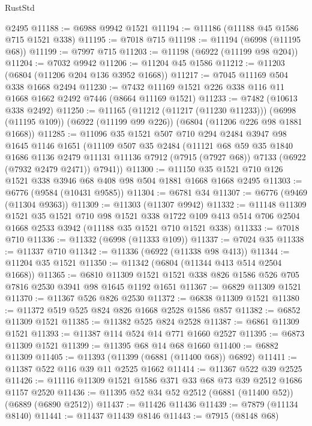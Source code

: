 \begin{lexlean}{RustStd}
\begin{coremodule}
    @2495
@11188 := @6988 @9942 @1521
@11194 := @11186 (@11188 @45 @1586 @715 @1521 @338)
@11195 := @7018 @715
@11198 := @11194 (@6998 (@11195 @68))
@11199 := @7997 @715
@11203 := @11198 (@6922 (@11199 @98 @204))
@11204 := @7032 @9942
@11206 := @11204 @45 @1586
@11212 := @11203 (@6804 (@11206 @204 @136 @3952 @1668))
@11217 := @7045 @11169 @504 @338 @1668 @2494
@11230 := @7432 @11169 @1521 @226 @338 @116 @11 @1668 @1662 @2492 @7446 (@8664 @11169 @1521)
@11233 := @7482 (@10613 @338 @2492)
@11250 := @11165
    (@11212 (@11217 (@11230 @11233)))
    (@6998 (@11195 @109))
    (@6922 (@11199 @99 @226))
    (@6804 (@11206 @226 @98 @1881 @1668))
@11285 := @11096
    @35
    @1521
    @507
    @710
    @294
    @2484
    @3947
    @98
    @1645
    @1146
    @1651
    (@11109
      @507
      @35
      @2484
      (@11121
        @68
        @59
        @35
        @1840
        @1686
        @1136
        @2479
        @11131
        @11136
        @7912
        (@7915 (@7927 @68))
        @7133
        (@6922 (@7932 @2479 @2471))
        @7941))
@11300 := @11150 @35 @1521 @710 @126 @1521 @338 @3946 @68 @408 @98 @504 @1881 @1668 @1668 @2495
@11303 := @6776 (@9584 (@10431 @9585))
@11304 := @6781 @34
@11307 := @6776 (@9469 (@11304 @9363))
@11309 := @11303 (@11307 @9942)
@11332 := @11148
    @11309
    @1521
    @35
    @1521
    @710
    @98
    @1521
    @338
    @1722
    @109
    @413
    @514
    @706
    @2504
    @1668
    @2533
    @3942
    (@11188 @35 @1521 @710 @1521 @338)
@11333 := @7018 @710
@11336 := @11332 (@6998 (@11333 @109))
@11337 := @7024 @35
@11338 := @11337 @710
@11342 := @11336 (@6922 (@11338 @98 @413))
@11344 := @11204 @35 @1521
@11350 := @11342 (@6804 (@11344 @413 @514 @2504 @1668))
@11365 := @6810 @11309 @1521 @1521 @338 @826 @1586 @526 @705 @7816 @2530 @3941 @98 @1645 @1192 @1651
@11367 := @6829 @11309 @1521
@11370 := @11367 @526 @826 @2530
@11372 := @6838 @11309 @1521
@11380 := @11372 @519 @525 @824 @826 @1668 @2528 @1586 @857
@11382 := @6852 @11309 @1521
@11385 := @11382 @525 @824 @2528
@11387 := @6861 @11309 @1521
@11393 := @11387 @114 @524 @14 @771 @1660 @2527
@11395 := @6873 @11309 @1521
@11399 := @11395 @68 @14 @68 @1660
@11400 := @6882 @11309
@11405 := @11393 (@11399 (@6881 (@11400 @68)) @6892)
@11411 := @11387 @522 @116 @39 @11 @2525 @1662
@11414 := @11367 @522 @39 @2525
@11426 := @11116 @11309 @1521 @1586 @371 @33 @68 @73 @39 @2512 @1686 @1157 @2520
@11436 := @11395 @52 @34 @52 @2512 (@6881 (@11400 @52)) (@6889 (@6890 @2512))
@11437 := @11426 @11436
@11439 := @7879 (@11134 @8140)
@11441 := @11437 @11439 @8146
@11443 := @7915 (@8148 @68)

\end{coremodule}
\end{lexlean}
